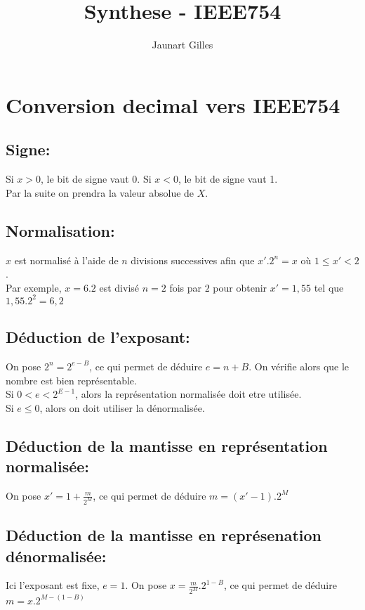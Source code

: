 \documentclass[11pt]{article}
\title{Synthese - IEEE754}
\author{Jaunart Gilles}
\date{}
\begin{document}
\maketitle

\section{Conversion decimal vers IEEE754}

\subsection{Signe:}
Si $x > 0$, le bit de signe vaut 0. Si $x < 0$, le bit de signe vaut 1. \\
Par la suite on prendra la valeur absolue de $X$.

\subsection{Normalisation:}
$x$ est normalisé à l’aide de $n$ divisions successives afin que $x'.2^n=x$ où $1 \leq x' <2$. \\
Par exemple, $x=6.2$ est divisé $n=2$ fois par $2$ pour obtenir $x'=1,55$ tel que $1,55.2^2=6,2$

\subsection{Déduction de l'exposant:}
On pose $2^n=2^{e-B}$, ce qui permet de déduire $e=n+B$. On vérifie alors que le nombre est bien représentable. \\
Si $0<e<2^{E-1}$, alors la représentation normalisée doit etre utilisée. \\
Si $e \leq 0$, alors on doit utiliser la dénormalisée.

\subsection{Déduction de la mantisse en représentation normalisée:}
On pose $x'=1+\frac{m}{2^M}$, ce qui permet de déduire $m=(x'-1).2^M$

\subsection{Déduction de la mantisse en représenation dénormalisée:}
Ici l'exposant est fixe, $e=1$. On pose $x=\frac{m}{2^M}.2^{1-B}$, ce qui permet de déduire $m=x.2^{M-(1-B)}$

\newpage
\end{document}
